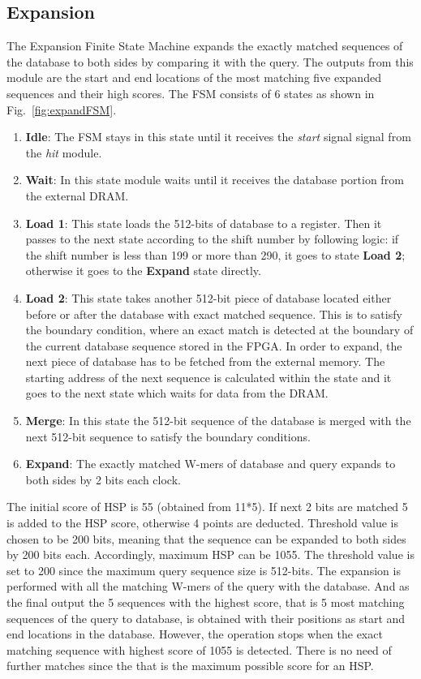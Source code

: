 \subsection{Expansion}
The Expansion Finite State Machine expands the exactly matched sequences of the database to both sides by comparing it with the query. 
The outputs from this module are the start and end locations of the most matching five expanded sequences and their high scores. The FSM consists of 6 states as shown in Fig.~\ref{fig:expandFSM}.

\begin{enumerate}
  \item \textbf{Idle}: The FSM stays in this state until it receives the \textit{start} signal signal from the \textit{hit} module.
  \item \textbf{Wait}: In this state module waits until it receives the database portion from the external DRAM.
  \item \textbf{Load 1}: This state loads the 512-bits of database to a register. Then it passes to the next state according to the shift number by following logic: if the shift number is less than 199 or more than 290, it goes to state \textbf{Load 2}; otherwise it goes to the \textbf{Expand} state directly. 
  \item \textbf{Load 2}: This state takes another 512-bit piece of database located either before or after the database with exact matched sequence. This is to satisfy the boundary condition, where an exact match is detected at the boundary of the current database sequence stored in the FPGA. In order to expand, the next piece of database has to be fetched from the external memory. 
The starting address of the next sequence is calculated within the state and it goes to the next state which waits for data from the DRAM. 
  \item \textbf{Merge}: In this state the 512-bit sequence of the database is merged with the next 512-bit sequence to satisfy the boundary conditions.
  \item \textbf{Expand}: The exactly matched W-mers of database and query expands to both sides by 2 bits each clock.
\end{enumerate}

The initial score of HSP is 55 (obtained from 11*5). 
If next 2 bits are matched 5 is added to the HSP score, otherwise 4 points are deducted. 
Threshold value is chosen to be 200 bits, meaning that the sequence can be expanded to both sides by 200 bits each. 
Accordingly, maximum HSP can be 1055. 
The threshold value is set to 200 since the maximum query sequence size is 512-bits.
The expansion is performed with all the matching W-mers of the query with the database. And as the final output the 5 sequences with the highest score, that is 5 most matching sequences of the query to database, is obtained with their positions as start and end locations in the database. However, the operation stops when the exact matching sequence with highest score of 1055 is detected.
There is no need of further matches since the that is the maximum possible score for an HSP.
       

